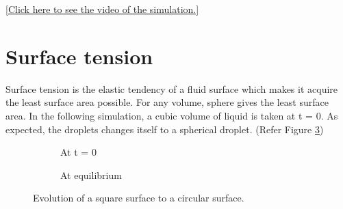 \documentclass{article}
\begin{document}
\begin{flushright}
	\href{https://www.youtube.com/watch?v=B9JiYVE437Y}{[Click here to see the video of the simulation.]}
\end{flushright}
   
\section{Surface tension}
Surface tension is the elastic tendency of a fluid surface which makes it acquire the least surface area possible. For any volume, sphere gives the least surface area. In the following simulation, a cubic volume of liquid is taken at t = 0. As expected, the droplets changes itself to a spherical droplet. (Refer Figure \ref{fig:surface_tension})

\begin{figure}[h!]
	\centering
	\begin{subfigure}[h!]{5cm}            
		\caption{At t = 0}
		\label{Fig:surface_initial}
	\end{subfigure}
	\begin{subfigure}[h!]{5cm}
		\centering
		\caption{At equilibrium }
		\label{Fig:surface_final}
	\end{subfigure}
	\caption{Evolution of a square surface to a circular surface.}\label{fig:surface_tension}
\end{figure}
\end{document}
